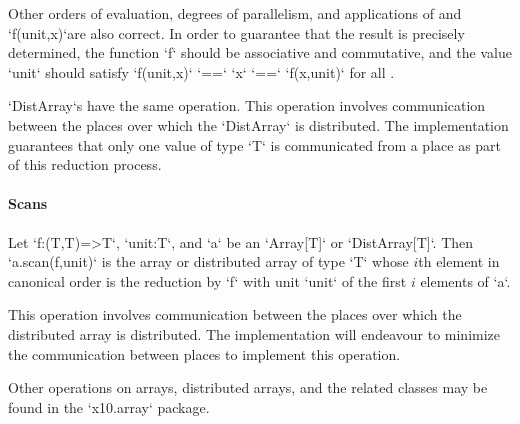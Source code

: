 Other orders of evaluation, degrees of parallelism, and applications of
 and \xcd`f(unit,x)`are also correct.
In order to guarantee that the result is precisely
determined, the  function \xcd`f` should be associative and
commutative, and the value \xcd`unit` should satisfy
\xcd`f(unit,x)` \xcd`==` \xcd`x` \xcd`==` \xcd`f(x,unit)`
for all .  




\xcd`DistArray`s have the same operation.
This operation involves communication between the places over which
the \xcd`DistArray` is distributed. The \Xten{} implementation guarantees that
only one value of type \xcd`T` is communicated from a place as part of
this reduction process.

\paragraph{Scans}\label{ArrayScans}


Let \xcd`f:(T,T)=>T`, \xcd`unit:T`, and \xcd`a` be an \xcd`Array[T]` or
\xcd`DistArray[T]`.  Then \xcd`a.scan(f,unit)` is the array or distributed
array of type \xcd`T` whose {$i$}th element in canonical order is the
reduction by \xcd`f` with unit \xcd`unit` of the first {$i$} elements of
\xcd`a`. 


This operation involves communication between the places over which the
distributed array is distributed. The \Xten{} implementation will endeavour to
minimize the communication between places to implement this operation.

Other operations on arrays, distributed arrays, and the related classes may be
found in the \xcd`x10.array` package.
